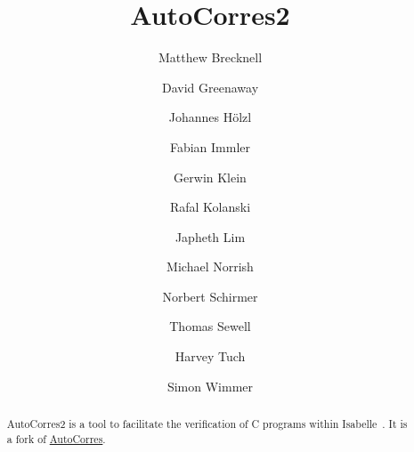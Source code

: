 \documentclass[11pt,a4paper]{report}
\begin{document}
\title{AutoCorres2}
\author{
 Matthew Brecknell \and
 David Greenaway \and
 Johannes Hölzl \and
 Fabian Immler \and 
 Gerwin Klein \and
 Rafal Kolanski \and
 Japheth Lim \and
 Michael Norrish \and
 Norbert Schirmer \and
 Thomas Sewell \and
 Harvey Tuch \and
 Simon Wimmer
}
\maketitle

\begin{abstract}
  AutoCorres2 is a tool to facilitate the verification of C programs within Isabelle~\cite{LNCS2283}.
  It is a fork of \href{https://trustworthy.systems/projects/OLD/autocorres/}{AutoCorres}.
\end{abstract}

\setlength\cftsubsecnumwidth{4em}
\tableofcontents






\end{document}

